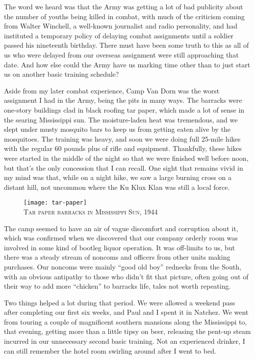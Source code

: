 \documentclass[../m3y]{subfiles}
\begin{document}
The word we heard was that the Army was getting a lot of bad publicity about the number of youths being killed in combat, with much of the criticism coming from Walter Winchell, a well-known journalist and radio personality, and had instituted a temporary policy of delaying combat assignments until a soldier passed his nineteenth birthday. There must have been some truth to this as all of us who were delayed from our overseas assignment were still approaching that date. And how else could the Army have us marking time other than to just start us on another basic training schedule?

Aside from my later combat experience, Camp Van Dorn was the worst assignment I had in the Army, being the pits in many ways. The barracks were one-story buildings clad in black roofing tar paper, which made a lot of sense in the searing Mississippi sun. The moisture-laden heat was tremendous, and we slept under musty mosquito bars to keep us from getting eaten alive by the mosquitoes. The training was heavy, and soon we were doing full 25-mile hikes with the regular 60 pounds plus of rifle and equipment. Thankfully, these hikes were started in the middle of the night so that we were finished well before noon, but that's the only concession that I can recall. One sight that remains vivid in my mind was that, while on a night hike, we saw a large burning cross on a distant hill, not uncommon where the Ku Klux Klan was still a local force.

\begin{figure}
\centering
\texttt{[image: tar-paper]}\\
\medskip
{\newtimes\textsc{Tar paper barracks in Mississippi Sun, 1944}}
\end{figure}

The camp seemed to have an air of vague discomfort and corruption about it, which was confirmed when we discovered that our company orderly room was involved in some kind of bootleg liquor operation. It was off-limits to us, but there was a steady stream of noncoms and officers from other units making purchases. Our noncoms were mainly ``good old boy'' rednecks from the South, with an obvious antipathy to those who didn't fit that picture, often going out of their way to add more ``chicken'' to barracks life, tales not worth repeating.

Two things helped a lot during that period. We were allowed a weekend pass after completing our first six weeks, and Paul and I spent it in Natchez. We went from touring a couple of magnificent southern mansions along the Mississippi to, that evening, getting more than a little tipsy on beer, releasing the pent-up steam incurred in our unnecessary second basic training. Not an experienced drinker, I can still remember the hotel room swirling around after I went to bed.
\end{document}
